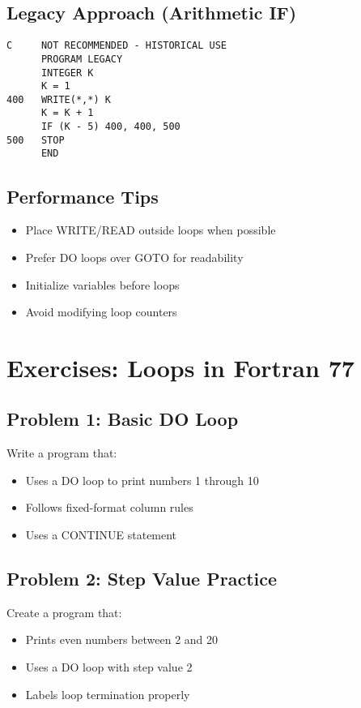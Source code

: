 \documentclass{book}
\begin{document}
\subsection*{Legacy Approach (Arithmetic IF)}
\begin{verbatim}
C     NOT RECOMMENDED - HISTORICAL USE
      PROGRAM LEGACY
      INTEGER K
      K = 1
400   WRITE(*,*) K
      K = K + 1
      IF (K - 5) 400, 400, 500
500   STOP
      END
\end{verbatim}

\subsection*{Performance Tips}
\begin{itemize}
\item Place WRITE/READ outside loops when possible
\item Prefer DO loops over GOTO for readability
\item Initialize variables before loops
\item Avoid modifying loop counters
\end{itemize}
\section{Exercises: Loops in Fortran 77}

\subsection*{Problem 1: Basic DO Loop}  
Write a program that:  
\begin{itemize}  
\item Uses a DO loop to print numbers 1 through 10  
\item Follows fixed-format column rules  
\item Uses a CONTINUE statement  
\end{itemize}

\subsection*{Problem 2: Step Value Practice}  
Create a program that:  
\begin{itemize}  
\item Prints even numbers between 2 and 20  
\item Uses a DO loop with step value 2  
\item Labels loop termination properly  
\end{itemize}
\end{document}
